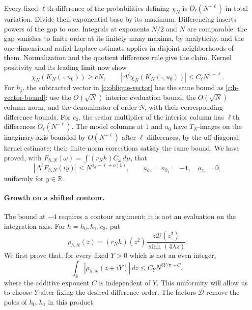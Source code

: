 Every fixed $\ell$th difference of the probabilities defining
$\chi_N$ is $O_\ell(N^{-\ell})$ in total variation.  Divide their
exponential base by its maximum.  Differencing inserts powers of the
gap to one.  Integrals at exponents $N/2$ and $N$ are comparable:
the gap vanishes to finite order at its finitely many maxima, by
analyticity, and the one-dimensional radial Laplace estimate applies
in disjoint neighborhoods of them.  Normalization and the quotient
difference rule give the claim.  Kernel positivity and its leading
limit now show
\[
 \chi_N(K_N(\cdot,u_0))\ge cN,
 \qquad
 |\Delta^\ell\chi_N(K_N(\cdot,u_0))|
 \le C_\ell N^{1-\ell}.
\]
For $h_j$, the subtracted vector in \eqref{c:oblique-vector} has the
same bound as \eqref{c:h-vector-bound}: use the $O(\sqrt N)$ interior
evaluation bound, the $O(\sqrt N)$ column norm, and the denominator
of order $N$, with their corresponding difference bounds.  For $c_3$,
the scalar multiplier of the interior column has $\ell$th differences
$O_\ell(N^{-\ell})$.  The model columns at $1$ and $u_0$ have
$T_N$-images on the imaginary axis bounded by $O(N^{-\ell})$
after $\ell$ differences, by the off-diagonal kernel estimate; their
finite-norm corrections satisfy the same bound.  We have proved,
with $F_{h,N}(\omega)=\int(r_Nh)C_\omega\,d\mu$, that
\begin{equation}\label{c:transform-uniform}
 |\Delta^\ell F_{h,N}(iy)|\le N^{a_h-\ell+o(1)},\qquad
 a_{h_0}=a_{h_1}=-1,\quad a_{c_3}=0,
\end{equation}
uniformly for $y\in\mathbb R$.

\paragraph{Growth on a shifted contour.}
The bound at $-4$ requires a contour argument; it is not an evaluation
on the integration axis.  For $h=h_0,h_1,c_3$, put
\[
 \rho_{h,N}(z)
 =(r_Nh)(z^2)\frac{z\mathcal D(z^2)}{\sinh(4\lambda z)}.
\]
We first prove that, for every fixed $Y>0$ which is not an even integer,
\begin{equation}\label{c:contour-growth}
 \int_{\mathbb R}|\rho_{h,N}(z+iY)|\,dz
 \le C_Y N^{bY/\pi+C},
\end{equation}
where the additive exponent $C$ is independent of $Y$.  This uniformity
will allow us to choose $Y$ after fixing the desired difference order.
The factors $\mathcal D$ remove the poles of $h_0,h_1$ in this product.


